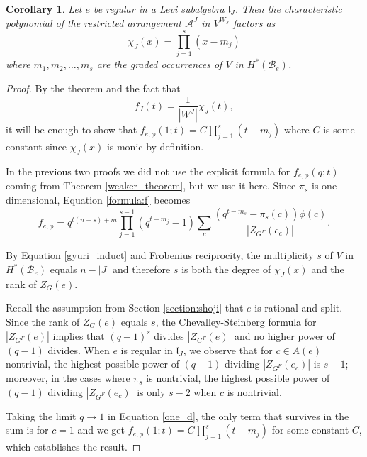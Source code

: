 \documentclass[10pt]{amsart}
\newcommand{\levi}{\mathfrak l}
\newcommand{\flag}{{\mathcal B}}
\theoremstyle{plain}
\newtheorem{corollary}[theorem]{Corollary}
\theoremstyle{definition}
\theoremstyle{remark}
\begin{document}
\begin{corollary} \label{cor:q to 1}
Let $e$ be regular in a Levi subalgebra $\levi_J$.
Then the characteristic polynomial of the restricted arrangement $\mathcal{A}^J$ in $V^{W_J}$ factors as 
$$\chi_J(x)  = \prod_{j=1}^{s} (x - m_j)$$
where $m_1, m_2, \dots, m_s$ are the graded occurrences of $V$ in $H^*(\flag_e)$.
\end{corollary}

\begin{proof}
By the theorem and the fact that $$f_J(t) = \frac{1}{|W^J|} \chi_J(t),$$ it will be enough to show that 
$f_{e, \phi}(1;t) = C \prod_{j=1}^{s} (t - m_j)$ where $C$ is some constant since $\chi_J(x)$ is monic by definition.

In the previous two proofs we did not use the explicit formula for $f_{e, \phi}(q;t)$ coming from Theorem \ref{weaker_theorem}, but we use it here.
Since $\pi_s$ is one-dimensional, Equation \ref{formula:f} becomes
\begin{equation} \label{one_d}
f_{e, \phi} = q^{t(n - s)+ m} \prod_{j=1}^{s-1} (q^{t-m_j} - 1)
 \sum_c  \frac{ (q^{t-m_s} - \pi_s(c)) \phi(c)} {|Z_{G^F}(e_c)|}.
 \end{equation}

By Equation \ref{gyuri_induct} and Frobenius reciprocity, the multiplicity $s$ of $V$  in $H^*(\flag_e)$
equals $n - |J|$ and therefore $s$ is both the degree of $\chi_J(x)$ and the rank of $Z_G(e)$.

Recall the assumption from Section \ref{section:shoji} that $e$ is rational and split.
Since the rank of $Z_G(e)$ equals $s$, 
the Chevalley-Steinberg formula for  $|Z_{G^F}(e)|$ implies that
$(q-1)^s$ divides $|Z_{G^F}(e)|$ and no higher power of $(q-1)$ divides.  
When $e$ is regular in $\levi_J$, we observe that for $c \in A(e)$ nontrivial, 
the highest  possible power of $(q-1)$ dividing $|Z_{G^F}(e_c)|$ is $s-1$; moreover, 
in the cases where $\pi_s$ is nontrivial, 
the highest possible power of $(q-1)$ dividing $|Z_{G^F}(e_c)|$ is only $s-2$ when $c$ is nontrivial.

Taking the limit $q \to 1$ in Equation \ref{one_d}, the only term that survives in the sum
is for $c=1$ and we get
$f_{e, \phi}(1;t) = C \prod_{j=1}^{s} (t - m_j)$ for some constant $C$, which establishes the result.  
\end{proof}
\end{document}
